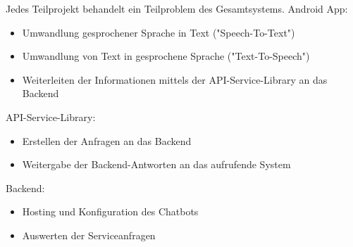 Jedes Teilprojekt behandelt ein Teilproblem des Gesamtsystems.
Android App:
\begin{itemize}\itemsep0pt
	\item Umwandlung gesprochener Sprache in Text ("Speech-To-Text")
	\item Umwandlung von Text in gesprochene Sprache ("Text-To-Speech")
	\item Weiterleiten der Informationen mittels der API-Service-Library an das Backend
\end{itemize}
API-Service-Library:
\begin{itemize}
	\item Erstellen der Anfragen an das Backend
	\item Weitergabe der Backend-Antworten an das aufrufende System
\end{itemize}
Backend:
\begin{itemize}
	\item Hosting und Konfiguration des Chatbots
	\item Auswerten der Serviceanfragen
\end{itemize}
